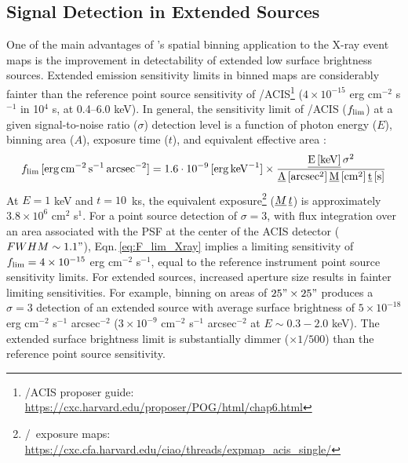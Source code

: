 \documentclass[modern]{CORE-AAS/aastex631}
\begin{document}
\subsection{Signal Detection in Extended Sources}
\label{Appendix:xray_SNR}
One of the main advantages of \SAUNAS's spatial binning application to the X-ray event maps is the improvement in detectability of extended low surface brightness sources. Extended emission sensitivity limits in binned maps are considerably fainter than the reference point source sensitivity of \Chandra/ACIS\footnote{\Chandra/ACIS proposer guide: \url{https://cxc.harvard.edu/proposer/POG/html/chap6.html}} ($4\times10^{-15}$ erg cm$^{-2}$ s$^{-1}$ in 10$^4$ s, at 0.4--6.0 keV). In general, the sensitivity limit of \Chandra/ACIS ($f_{\rm lim}$) at a given signal-to-noise ratio ($\sigma$) detection level is a function of photon energy ($E$), binning area ($A$), exposure time ($t$), and equivalent effective area \citep[$M$, which has a complex variation with energy, see Fig.\,6 in][]{evans+2010apj189_37}:
\begin{equation}
\label{eq:F_lim_Xray}
f_{\rm{lim}}\,[\rm{erg}\,\rm{cm}^{-2}\,\rm{s}^{-1}\,\rm{arcsec}^{-2} ] =\\ 1.6\cdot10^{-9}\,[\rm{erg} \, \rm{keV}^{-1}] \times\frac{\emph{E\,[\rm{keV}]}\,\sigma^2}{\emph{A}\,[arcsec^2]\,\emph{M}\,[cm^2]\,\emph{t}\,[s]}
\end{equation}
At $E=1$ keV and $t=10$~ks, the equivalent exposure\footnote{\ciao/\Chandra\ exposure maps: \url{https://cxc.cfa.harvard.edu/ciao/threads/expmap_acis_single/}} ($\emph{M}\,\emph{t}$) is approximately $3.8\times10^{6}$ cm$^{2}$ s$^{1}$. For a point source detection of $\sigma=3$, with flux integration over an area associated with the PSF at the center of the ACIS detector ($FWHM\sim1.1"$), Eqn.\,\ref{eq:F_lim_Xray} implies a limiting sensitivity of $f_{\rm{lim}} = 4\times10^{-15}$ erg cm$^{-2}$ s$^{-1}$, equal to the reference instrument point source sensitivity limits.
For extended sources, increased aperture size results in fainter limiting sensitivities. For example, binning on areas of $25"\times25"$ produces a $\sigma=3$ detection of an extended source with average surface brightness of $5\times10^{-18}$ erg cm$^{-2}$ s$^{-1}$ arcsec$^{-2}$ ($3\times10^{-9}$ cm$^{-2}$ s$^{-1}$ arcsec$^{-2}$ at $E\sim0.3-2.0$ keV). The extended surface brightness limit is substantially dimmer ($\times1/500$) than the reference point source sensitivity.
\end{document}
